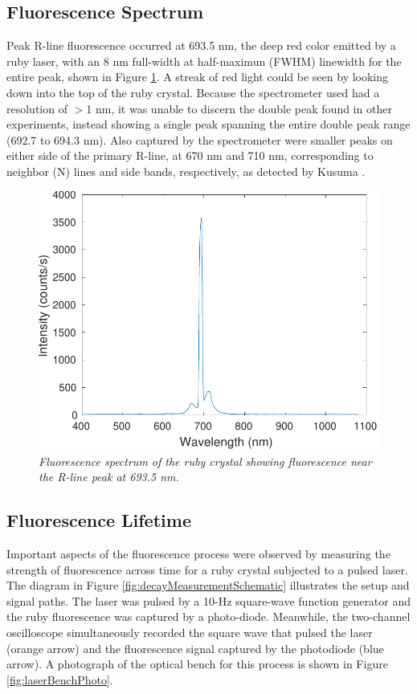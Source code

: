 \documentclass[11pt, a4paper, twocolumn]{article}
\begin{document}
\subsection*{Fluorescence Spectrum}

Peak R-line fluorescence occurred at 693.5 nm, the deep red color emitted by a ruby laser, with an 8 nm full-width at half-maximun (FWHM) linewidth for the entire peak, shown in Figure \ref{fig:fluorescenceSpectrum}. A streak of red light could be seen by looking down into the top of the ruby crystal. Because the spectrometer used had a resolution of $>$1 nm, it was unable to discern the double peak found in other experiments, instead showing a single peak spanning the entire double peak range (692.7 to 694.3 nm). Also captured by the spectrometer were smaller peaks on either side of the primary R-line, at 670 nm and 710 nm, corresponding to neighbor (N) lines and side bands, respectively, as detected by Kusuma \cite{Kusuma}.

\begin{figure} [t]
\includegraphics[width=\linewidth]{fluorescenceSpectrum.pdf}
\caption{\textit{Fluorescence spectrum of the ruby crystal showing fluorescence near the R-line peak at 693.5 nm.}}
\label{fig:fluorescenceSpectrum}
\end{figure}

\subsection*{Fluorescence Lifetime}
Important aspects of the fluorescence process were observed by measuring the strength of fluorescence across time for a ruby crystal subjected to a pulsed laser. The diagram in Figure \ref{fig:decayMeasurementSchematic} illustrates the setup and signal paths. The laser was pulsed by a 10-Hz square-wave function generator and the ruby fluorescence was captured by a photo-diode. Meanwhile, the two-channel oscilloscope simultaneously recorded the square wave that pulsed the laser (orange arrow) and the fluorescence signal captured by the photodiode (blue arrow). A photograph of the optical bench for this process is shown in Figure \ref{fig:laserBenchPhoto}.
\end{document}
